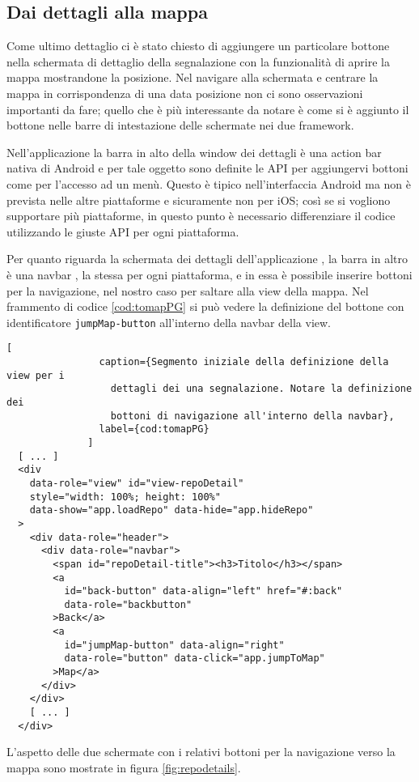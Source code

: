         \subsection{Dai dettagli alla mappa}
            Come ultimo dettaglio ci è stato chiesto di aggiungere un
            particolare bottone nella schermata di dettaglio della segnalazione
            con la funzionalità di aprire la mappa mostrandone la
            posizione. Nel navigare alla schermata e centrare la mappa in
            corrispondenza di una data posizione non ci sono osservazioni
            importanti da fare; quello che è più interessante da notare è come
            si è aggiunto il bottone nelle barre di intestazione delle schermate
            nei due framework.

            Nell'applicazione \tisdk{} la barra in alto della window dei
            dettagli è una action bar nativa di Android e per tale oggetto sono
            definite le API per aggiungervi bottoni come per l'accesso ad un
            menù. Questo è tipico nell'interfaccia Android ma non è prevista
            nelle altre piattaforme e sicuramente non per iOS; così se si
            vogliono supportare più piattaforme, in questo punto è necessario
            differenziare il codice utilizzando le giuste API per ogni
            piattaforma.

            Per quanto riguarda la schermata dei dettagli dell'applicazione
            \pg{}, la barra in altro è una navbar \kendomob{}, la stessa per
            ogni piattaforma, e in essa è possibile inserire bottoni per la
            navigazione, nel nostro caso per saltare alla view della mappa. Nel
            frammento di codice \ref{cod:tomapPG} si può vedere la definizione
            del bottone con identificatore \texttt{jumpMap-button} all'interno
            della navbar della view.
            \begin{lstlisting}[
                caption={Segmento iniziale della definizione della view per i
                  dettagli dei una segnalazione. Notare la definizione dei
                  bottoni di navigazione all'interno della navbar},
                label={cod:tomapPG}
              ]
  [ ... ]
  <div
    data-role="view" id="view-repoDetail"
    style="width: 100%; height: 100%"
    data-show="app.loadRepo" data-hide="app.hideRepo"
  >
    <div data-role="header">
      <div data-role="navbar">
        <span id="repoDetail-title"><h3>Titolo</h3></span>
        <a
          id="back-button" data-align="left" href="#:back"
          data-role="backbutton"
        >Back</a>
        <a
          id="jumpMap-button" data-align="right"
          data-role="button" data-click="app.jumpToMap"
        >Map</a>
      </div>
    </div>
    [ ... ]
  </div>
            \end{lstlisting}

            L'aspetto delle due schermate con i relativi bottoni per la
            navigazione verso la mappa sono mostrate in figura
            \ref{fig:repodetails}.
